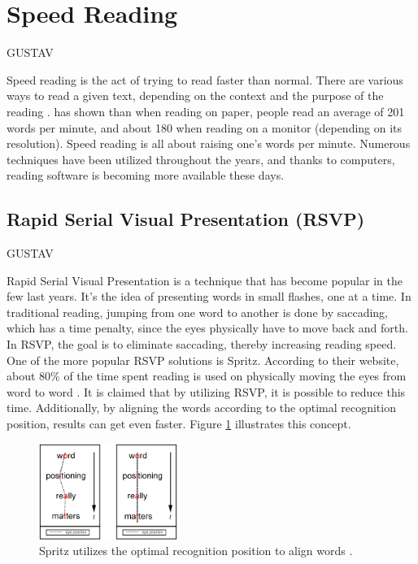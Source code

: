 \section{Speed Reading}
GUSTAV

Speed reading is the act of trying to read faster than normal. There are various ways to read a given text, depending on the context and the purpose of the reading \cite{differentWaysOfReading}.  has shown than when reading on paper, people read an average of 201 words per minute, and about 180 when reading on a monitor (depending on its resolution). Speed reading is all about raising one's words per minute. Numerous techniques have been utilized throughout the years, and  thanks to computers, reading software is becoming more available these days.


\subsection{Rapid Serial Visual Presentation (RSVP)}
GUSTAV

Rapid Serial Visual Presentation is a technique that has become popular in the few last years. It's the idea of presenting words in small flashes, one at a time. In traditional reading, jumping from one word to another is done by saccading, which has a time penalty, since the eyes physically have to move back and forth. In RSVP, the goal is to eliminate saccading, thereby increasing reading speed. One of the more popular RSVP solutions is Spritz. According to their website, about 80\% of the time spent reading is used on physically moving the eyes from word to word \cite{spritz}.	It is claimed that by utilizing RSVP, it is possible to reduce this time. Additionally, by aligning the words according to the optimal recognition position, results can get even faster. Figure \ref{fig:spritz_orp} illustrates this concept.

\begin{figure}[htbp]
\centering
\includegraphics[width=0.4\textwidth]{Pics/opr_spritz}
\caption{Spritz utilizes the optimal recognition position to align words \protect\cite{spritz}.}
\label{fig:spritz_orp}
\end{figure}

